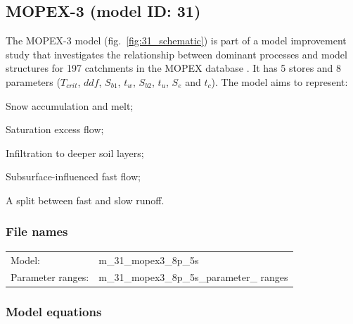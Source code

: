 \subsection{MOPEX-3 (model ID: 31)}
The MOPEX-3 model (fig.~\ref{fig:31_schematic}) is part of a model improvement study that investigates the relationship between dominant processes and model structures for 197 catchments in the MOPEX database \citep{Ye2012}. It has 5 stores and 8 parameters ($T_{crit}$, $ddf$, $S_{b1}$, $t_w$, $S_{b2}$, $t_u$, $S_e$ and $t_c$). The model aims to represent:

\begin{itemizecompact}
\item Snow accumulation and melt;
\item Saturation excess flow;
\item Infiltration to deeper soil layers;
\item Subsurface-influenced fast flow;
\item A split between fast and slow runoff.
\end{itemizecompact}

\subsubsection{File names}
\begin{tabular}{@{}ll}
Model: &m\_31\_mopex3\_8p\_5s \\
Parameter ranges: &m\_31\_mopex3\_8p\_5s\_parameter\_ ranges \\
\end{tabular}

\subsubsection{Model equations}

